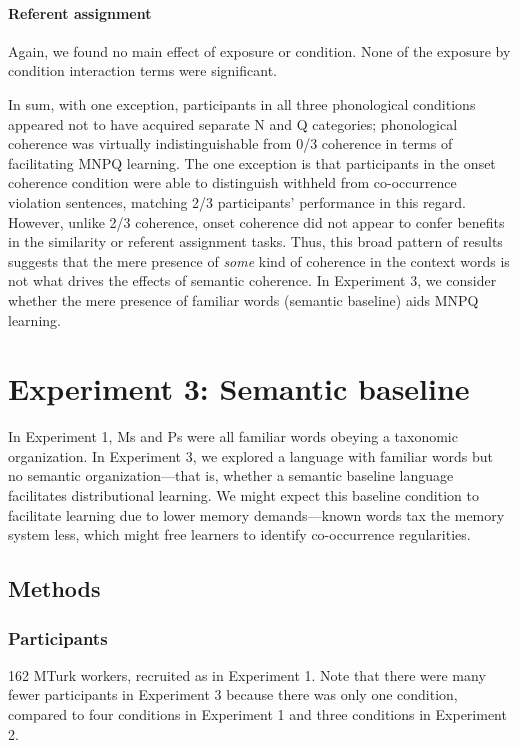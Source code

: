 \documentclass[man,floatsintext]{apa6}
\begin{document}
\paragraph{Referent assignment}
Again, we found no main effect of exposure or condition. None of the exposure by condition interaction terms were significant.

In sum, with one exception, participants in all three phonological conditions appeared not to have acquired separate N and Q categories; phonological coherence was virtually indistinguishable from 0/3 coherence in terms of facilitating MNPQ learning. The one exception is that participants in the onset coherence condition were able to distinguish withheld from co-occurrence violation sentences, matching 2/3 participants' performance in this regard. However, unlike 2/3 coherence, onset coherence did not appear to confer benefits in the similarity or referent assignment tasks. Thus, this broad pattern of results suggests that the mere presence of \emph{some} kind of coherence in the context words is not what drives the effects of semantic coherence. In Experiment 3, we consider whether the mere presence of familiar words (semantic baseline) aids MNPQ learning.

\section{Experiment 3: Semantic baseline}

In Experiment 1, Ms and Ps were all familiar words obeying a taxonomic organization. In Experiment 3, we explored a language with familiar words but no semantic organization---that is, whether a semantic baseline language facilitates distributional learning. We might expect this baseline condition to facilitate learning due to lower memory demands---known words tax the memory system less, which might free learners to identify co-occurrence regularities.

\subsection{Methods}
\subsubsection{Participants}
162 MTurk workers, recruited as in Experiment 1. Note that there were many fewer participants in Experiment 3 because there was only one condition, compared to four conditions in Experiment 1 and three conditions in Experiment 2.
\end{document}
